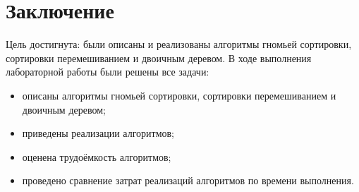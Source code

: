 \chapter*{Заключение}

Цель достигнута: были описаны и реализованы алгоритмы гномьей сортировки, сортировки перемешиванием и двоичным деревом. В ходе выполнения лабораторной работы были решены все задачи:
\begin{itemize}
	\item описаны алгоритмы гномьей сортировки, сортировки перемешиванием и двоичным деревом;
	\item приведены реализации алгоритмов;
	\item оценена трудоёмкость алгоритмов;
	\item проведено сравнение затрат реализаций алгоритмов по времени выполнения.
\end{itemize}



